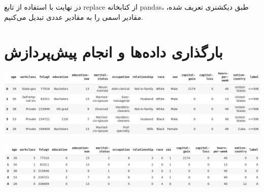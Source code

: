 \documentclass{article}
\begin{document}
در نهایت با استفاده از تابع replace از کتابخانه pandas، طبق دیکشنری تعریف شده، مقادیر اسمی را به مقادیر عددی تبدیل می‌کنیم.






\let\oldsection\section
\renewcommand\section{\clearpage\oldsection}





\section{
بارگذاری داده‌ها و انجام پیش‌پردازش
}

\begin{center}
	\includegraphics[scale=0.35]{df.png} 
\end{center}    


\begin{center}
	\includegraphics[scale=0.35]{df_numeric.png} 
\end{center}    




\medskip

\small
\LTR 
\latin
\end{document}
